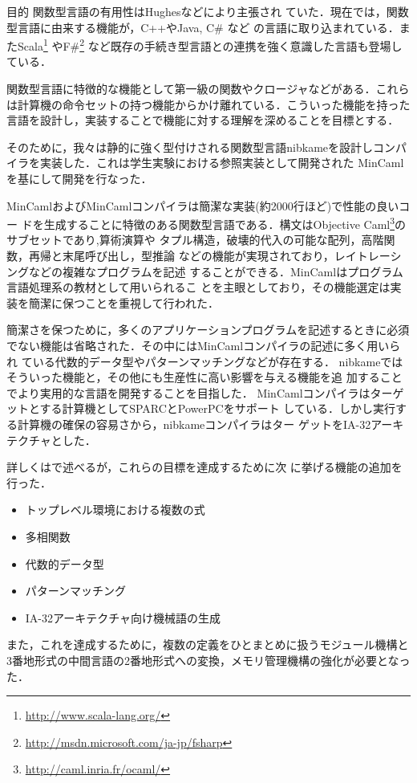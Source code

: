 \documentclass[a4paper,titlepage,report,disablejfam]{jsbook}
\begin{document}
\begin{resbonsiblesection}{目的}{\kobori}
関数型言語の有用性はHughes\cite{hughes1989functional}などにより主張され
ていた．現在では，関数型言語に由来する機能が，C++やJava, C\# など
の言語に取り込まれている．またScala\footnote{\url{http://www.scala-lang.org/}}
やF\#{}\footnote{\url{http://msdn.microsoft.com/ja-jp/fsharp}}
など既存の手続き型言語との連携を強く意識した言語も登場している．

関数型言語に特徴的な機能として第一級の関数やクロージャなどがある．これら
は計算機の命令セットの持つ機能からかけ離れている．こういった機能を持った
言語を設計し，実装することで機能に対する理解を深めることを目標とする．

そのために，我々は静的に強く型付けされる関数型言語nibkameを設計しコンパ
イラを実装した．これは学生実験における参照実装として開発された
MinCaml\cite{住井英二郎:2008-04-24}を基にして開発を行なった．

MinCamlおよびMinCamlコンパイラは簡潔な実装(約2000行ほど)で性能の良いコー
ドを生成することに特徴のある関数型言語である．構文はObjective
Caml\footnote{\url{http://caml.inria.fr/ocaml/}}のサブセットであり,算術演算や
タプル構造，破壊的代入の可能な配列，高階関数，再帰と末尾呼び出し，型推論
などの機能が実現されており，レイトレーシングなどの複雑なプログラムを記述
することができる．MinCamlはプログラム言語処理系の教材として用いられるこ
とを主眼としており，その機能選定は実装を簡潔に保つことを重視して行われた．

簡潔さを保つために，多くのアプリケーションプログラムを記述するときに必須
でない機能は省略された．その中にはMinCamlコンパイラの記述に多く用いられ
ている代数的データ型やパターンマッチングなどが存在する．
nibkameではそういった機能と，その他にも生産性に高い影響を与える機能を追
加することでより実用的な言語を開発することを目指した．
MinCamlコンパイラはターゲットとする計算機としてSPARCとPowerPCをサポート
している．しかし実行する計算機の確保の容易さから，nibkameコンパイラはター
ゲットをIA-32アーキテクチャとした．

詳しくはで述べるが，これらの目標を達成するために次
に挙げる機能の追加を行った．
\begin{itemize}
 \item トップレベル環境における複数の式
 \item 多相関数
 \item 代数的データ型
 \item パターンマッチング
 \item IA-32アーキテクチャ向け機械語の生成
\end{itemize}
また，これを達成するために，複数の定義をひとまとめに扱うモジュール機構と
3番地形式の中間言語の2番地形式への変換，メモリ管理機構の強化が必要となっ
た．
\end{resbonsiblesection}
\end{document}
